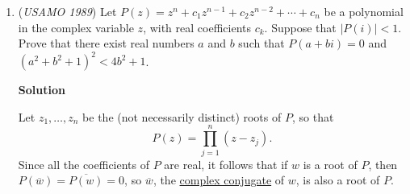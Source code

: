 \begin{enumerate}
 All possibilities yield a contradiction, so our assumption can not be correct.

 (Cases when largest set $E$ is smaller than $6$ are equivalent and weaker)

 



\textbf{Solution 4}

Assume, for the sake of contradiction, that there is no set of 6 games with 12 distinct players. Then the largest possible collection of games with all distinct players must consist of at most 5 games, involving at most 10 players.So suppose we have 5 such games with 10 distinct players. This leaves 10 other players who must still appear in the schedule. Since there are a total of 14 games, there are $14-5=9$ games remaining to cover these 10 players.

 Each game has 2 players, so the 9 games account for 18 ``player slots.\textit{ If every one of the 10 unused players is to appear at least once, then by the pigeonhole principle, some game among these 9 must contain two of the 10 unused players.}But then that game, together with the original 5 disjoint games, would give 6 games with 12 distinct players. This contradicts our assumption that no such collection exists.Therefore, there must in fact exist a set of 6 games with 12 distinct players.

 


	\item (\textit{USAMO 1989}) Let $P(z)= z^n + c_1 z^{n-1} + c_2 z^{n-2} + \cdots + c_n$ be a polynomial in the complex variable $z$, with real coefficients $c_k$. Suppose that $|P(i)| < 1$. Prove that there exist real numbers $a$ and $b$ such that $P(a + bi) = 0$ and $(a^2 + b^2 + 1)^2 < 4 b^2 + 1$.


 



\textbf{Solution}

Let $z_1, \dotsc, z_n$ be the (not necessarily distinct) roots of $P$, so that
 \[P(z) = \prod_{j=1}^n (z- z_j) .\]Since all the coefficients of $P$ are real, it follows that if $w$ is a root of $P$, then $P( \overline{w}) = \overline{ P(w)} = 0$, so $\overline{w}$, the \href{https://artofproblemsolving.com/wiki/index.php?title=Complex\_conjugate}{complex conjugate} of $w$, is also a root of $P$.


\end{enumerate}
